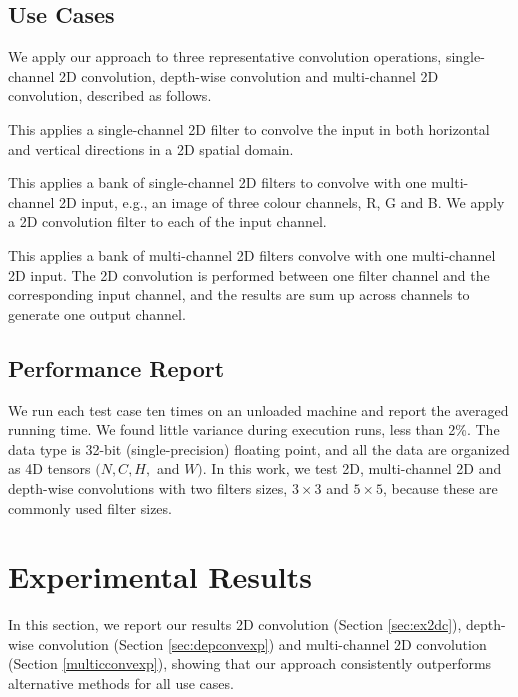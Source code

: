 \subsection{Use Cases}
We apply our approach to three representative convolution operations, single-channel 2D convolution, depth-wise convolution and
multi-channel 2D convolution, described as follows.

 This applies a single-channel 2D filter to convolve the input in both horizontal and vertical
directions in a 2D spatial domain.

 This applies a bank of single-channel 2D filters to convolve with one multi-channel 2D input, e.g., an
image of three colour channels, R, G and B. We apply a 2D convolution filter to each of the input channel.

 This applies a bank of multi-channel 2D filters convolve with one multi-channel 2D input. The 2D
convolution is performed between one filter channel and the corresponding input channel, and the results are sum up across channels to
generate one output channel.


\subsection{Performance Report} We run each test case ten times on an unloaded machine and report the averaged running time. We found
little variance during execution runs, less than 2\%.  The data type is 32-bit (single-precision) floating point, and all the data are
organized as 4D tensors $(N,C,H,$ and $W)$. In this work, we test 2D, multi-channel 2D and depth-wise convolutions with two filters sizes,
$3 \times 3$ and $5 \times 5$, because these are commonly used filter sizes.
%

\section{Experimental Results}
\label{exp} In this section, we report our results 2D convolution (Section \ref{sec:ex2dc}), depth-wise convolution (Section
\ref{sec:depconvexp}) and multi-channel 2D convolution (Section \ref {multicconvexp}), showing that our approach consistently outperforms
alternative methods for all use cases.


